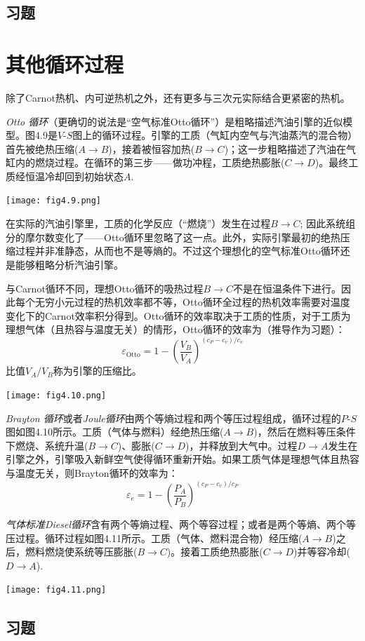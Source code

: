 \subsection*{习题}

\section{其他循环过程}
\label{equ4.10}
除了Carnot热机、内可逆热机之外，还有更多与三次元实际结合更紧密的热机。

{\it Otto 循环}（更确切的说法是“空气标准Otto循环”）是粗略描述汽油引擎的近似模型。图4.9是$V\text{-}S$图上的循环过程。引擎的工质（气缸内空气与汽油蒸汽的混合物）首先被绝热压缩($A \rightarrow B$)，接着被恒容加热($B \rightarrow C$)；这一步粗略描述了汽油在气缸内的燃烧过程。在循环的第三步——做功冲程，工质绝热膨胀($C \rightarrow D$)。最终工质经恒温冷却回到初始状态$A$.

{
	\centering
	\texttt{[image: fig4.9.png]}
}

在实际的汽油引擎里，工质的化学反应（“燃烧”）发生在过程$B \rightarrow C$; 因此系统组分的摩尔数变化了——Otto循环里忽略了这一点。此外，实际引擎最初的绝热压缩过程并非准静态，从而也不是等熵的。不过这个理想化的空气标准Otto循环还是能够粗略分析汽油引擎。

与Carnot循环不同，理想Otto循环的吸热过程$B \rightarrow C$不是在恒温条件下进行。因此每个无穷小元过程的热机效率都不等，Otto循环全过程的热机效率需要对温度变化下的Carnot效率积分得到。Otto循环的效率取决于工质的性质，对于工质为理想气体（且热容与温度无关）的情形，Otto循环的效率为（推导作为习题）：
\begin{equation}
	\varepsilon_{\text{Otto}} = 1 - \left( \frac{V_B}{V_A} \right)^{ (c_P - c_v) / c_v }
\label{equ4.30}
\end{equation}
比值$V_A / V_B$称为引擎的压缩比。

{
	\centering
	\texttt{[image: fig4.10.png]}
}

{\it Brayton 循环}或者{\it Joule循环}由两个等熵过程和两个等压过程组成，循环过程的$P \text{-} S$图如图4.10所示。工质（气体与燃料）经绝热压缩($A \rightarrow B$)，然后在燃料等压条件下燃烧、系统升温($B \rightarrow C$)、膨胀($C \rightarrow D$)，并释放到大气中。过程$D \rightarrow A$发生在引擎之外，引擎吸入新鲜空气使得循环重新开始。如果工质气体是理想气体且热容与温度无关，则Brayton循环的效率为：
\begin{equation}
	\varepsilon_e = 1 - \left( \frac{P_A}{P_B} \right)^{(c_P - c_v) / c_P}
\label{equ4.31}
\end{equation}

{\it 气体标准Diesel循环}含有两个等熵过程、两个等容过程；或者是两个等熵、两个等压过程。循环过程如图4.11所示。工质（气体、燃料混合物）经压缩($A \rightarrow B$)之后，燃料燃烧使系统等压膨胀($B \rightarrow C$)。接着工质绝热膨胀($C \rightarrow D$)并等容冷却($D \rightarrow A$).

{
	\centering
	\texttt{[image: fig4.11.png]}
}

\subsection*{习题}









